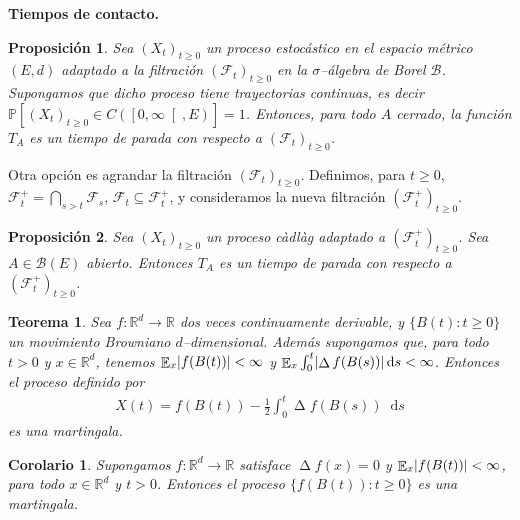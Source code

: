 \documentclass{article}
\newcommand{\cadlag}{càdlàg}
\newcommand{\prob}{\mathbb{P}}
\newcommand{\events}{\mathcal{F}}
\newcommand{\eventspp}{\events^+}
\newcommand{\borel}{\mathcal{B}}
\newcommand{\dd}{\mathop{}\!\mathrm{d}}
\newcommand{\realNumbers}{\mathbb{R}}
\DeclareMathOperator{\laplacian}{\Delta}
\DeclareMathOperator{\Expectation}{\mathbb{E}}
\DeclarePairedDelimiter{\abs}{\lvert}{\rvert}
\theoremstyle{plain}
\newtheorem{theorem}{Teorema}
\newtheorem{proposition}{Proposición}
\newtheorem{corollary}{Corolario}
\theoremstyle{remark}
\theoremstyle{definition}
\begin{document}
\textbf{Tiempos de contacto.}

\begin{proposition}
  Sea \((X_t)_{t \geq 0}\) un proceso estocástico en el espacio métrico \((E, d)\) adaptado a la filtración \((\events_t)_{t \geq 0}\) en la \(\sigma\)--álgebra de Borel \(\borel\).
  Supongamos que dicho proceso tiene trayectorias continuas, es decir \(\prob[ (X_t)_{t \geq 0} \in C(\left[0, \infty \right[, E)] = 1\).
  Entonces, para todo \(A\) cerrado, la función \(T_A\) es un tiempo de parada con respecto a \((\events_t)_{t \geq 0}\).
\end{proposition}

Otra opción es agrandar la filtración \((\events_t)_{t \geq 0}\).
Definimos, para \(t \geq 0\), \(\eventspp_t = \bigcap_{s > t} \events_s\), \(\events_t \subseteq \eventspp_t\), y consideramos la nueva filtración \((\eventspp_t)_{t \geq 0}\).
\begin{proposition}
  Sea \((X_t)_{t \geq 0}\) un proceso \cadlag{} adaptado a \((\eventspp_t)_{t \geq 0}\).
  Sea \(A \in \borel(E)\) abierto.
  Entonces \(T_A\) es un tiempo de parada con respecto a \((\eventspp_t)_{t \geq 0}\).
\end{proposition}


\begin{theorem}
  Sea \(f : \realNumbers^d \rightarrow \realNumbers\) dos veces continuamente derivable, y \(\{B(t) : t \geq 0\}\) un movimiento Browniano \(d\)--dimensional.
  Además supongamos que, para todo \(t > 0\) y \(x \in \realNumbers^d\), tenemos \(\Expectation_x \abs{f(B(t))} < \infty\) y \(\Expectation_x \int_0^t \abs{\laplacian f(B(s))} \dd s < \infty\).
  Entonces el proceso definido por
  \begin{align}
    X(t)
    =
    f(B(t)) - \frac{1}{2} \int_0^t \laplacian f(B(s)) \dd s
  \end{align}
  es una martingala.
\end{theorem}
\begin{corollary}
  Supongamos \(f : \realNumbers^d \rightarrow \realNumbers\) satisface \(\laplacian f(x) = 0\) y \(\Expectation_x \abs{f(B(t))} < \infty\), para todo \(x \in \realNumbers^d\) y \(t > 0\).
  Entonces el proceso \(\{f(B(t)) : t \geq 0\}\) es una martingala.
\end{corollary}
\end{document}
